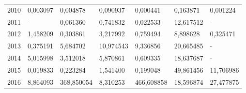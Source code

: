 \begin{table}
\begin{tabular}{p{1cm}p{2cm}p{2cm}p{2cm}p{2cm}p{2cm}p{2cm}}
 2010 &                   0,003097 &          0,004878 &               0,090937 &   0,000441 &                                     0,163871 &                                  0,001224 \\
 2011 &                          - &          0,061360 &               0,741832 &   0,022533 &                                    12,617512 &                                         - \\
 2012 &                   1,458209 &          0,303861 &               3,217992 &   0,759494 &                                     8,898628 &                                  0,325471 \\
 2013 &                   0,375191 &          5,684702 &              10,974543 &   9,336856 &                                    20,665485 &                                         - \\
 2014 &                   5,015998 &          3,512018 &               5,870861 &   0,609335 &                                    18,637687 &                                         - \\
 2015 &                   0,019833 &          0,223284 &               1,541400 &   0,199048 &                                    49,861456 &                                 11,706986 \\
 2016 &                   8,864093 &        368,850054 &               8,310253 & 466,608858 &                                    18,596874 &                                 27,477875 \\
\bottomrule
\end{tabular}
\end{table}
